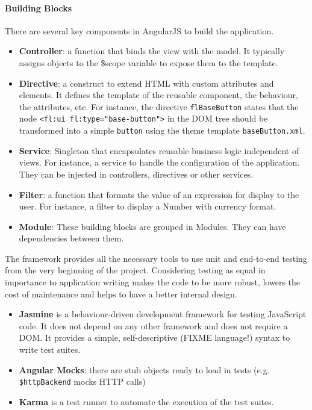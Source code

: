 \paragraph{Building Blocks} There are several key components in AngularJS to build the application.

\begin{itemize}
    \item \textbf{Controller}: a function that binds the view with the model. It typically assigns objects to the \$scope variable to expose them to the template.
    \item \textbf{Directive}: a construct to extend HTML with custom attributes and elements. It defines the template of the reusable component, the behaviour, the attributes, etc. For instance, the directive \texttt{flBaseButton} states that the node \lstinline$<fl:ui fl:type="base-button">$ in the \ac{DOM} tree should be transformed into a simple \texttt{button} using the theme template \texttt{baseButton.xml}. 
    \item \textbf{Service}: Singleton that encapsulates reusable business logic independent of views. For instance, a service to handle the configuration of the application. They can be injected in controllers, directives or other services.
    \item \textbf{Filter}: a function that formats the value of an expression for display to the user. For instance, a filter to display a Number with currency format.
    \item \textbf{Module}: These building blocks are grouped in Modules. They can have dependencies between them.
\end{itemize}

The framework provides all the necessary tools to use unit and end-to-end testing from the very beginning of the project.
Considering testing as equal in importance to application writing makes the code to be more robust, lowers the cost of maintenance and helps to have a better internal design.
\begin{itemize}
    \item \textbf{Jasmine} is a behaviour-driven development framework for testing JavaScript code. It does not depend on any other framework and does not require a \ac{DOM}. It provides a simple, self-descriptive (FIXME language!) syntax to write test suites.
    \item \textbf{Angular Mocks}: there are stub objects ready to load in tests (e.g. \texttt{\$httpBackend} mocks \ac{HTTP} calls)
    \item \textbf{Karma} is a test runner to automate the execution of the test suites. 
\end{itemize}
    

